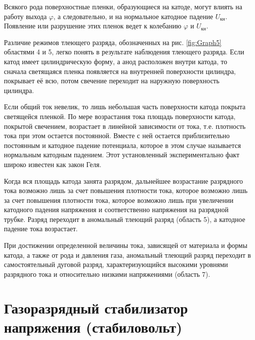 \documentclass[a4paper, 12pt]{article}
\begin{document}
	Всякого рода поверхностные пленки, образующиеся на катоде, могут влиять на работу выхода $\varphi$, а следовательно, и на нормальное катодное падение $U_\text{кн}$. Появление или разрушение этих пленок ведет к колебанию $\varphi$ и $U_\text{кн}$.\par
	Различие режимов тлеющего разряда, обозначенных на рис. \ref{fig:Graph5} областями 4 и 5, легко понять в результате наблюдения тлеющего разряда. Если катод имеет цилиндрическую форму, а анод расположен внутри катода, то сначала светящаяся пленка появляется на внутренней поверхности цилиндра, покрывает её всю, потом свечение переходит на наружную поверхность цилиндра.\par
	Если общий ток невелик, то лишь небольшая часть поверхности катода покрыта светящейся пленкой. По мере возрастания тока площадь поверхности катода, покрытой свечением, возрастает в линейной зависимости от тока, т.е. плотность тока при этом остается постоянной. Вместе с ней остается приблизительно постоянным и катодное падение потенциала, которое в этом случае называется нормальным катодным падением. Этот установленный экспериментально факт широко известен как закон Геля.\par
	Когда вся площадь катода занята разрядом, дальнейшее возрастание разрядного тока возможно лишь за счет повышения плотности тока, которое возможно лишь за счет повышения плотности тока, которое возможно лишь при увеличении катодного падения напряжения и соответственно напряжения на разрядной трубке. Разряд переходит в аномальный тлеющий разряд (область 5), а катодное падение тока возрастает.\par
	При достижении определенной величины тока, зависящей от материала и формы катода, а также от рода и давления газа, аномальный тлеющий разряд переходит в самостоятельный дуговой разряд, характеризующийся высокими уровнями разрядного тока и относительно низкими напряжениями (область 7).
	\section{Газоразрядный стабилизатор напряжения (стабиловольт)}
\end{document}
